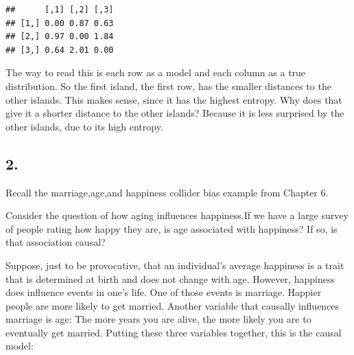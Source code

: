 \documentclass[
]{article}
\newenvironment{Shaded}{\begin{snugshade}}{\end{snugshade}}
\newcommand{\CommentTok}[1]{\textcolor[rgb]{0.56,0.35,0.01}{\textit{#1}}}
\newcommand{\ControlFlowTok}[1]{\textcolor[rgb]{0.13,0.29,0.53}{\textbf{#1}}}
\newcommand{\DataTypeTok}[1]{\textcolor[rgb]{0.13,0.29,0.53}{#1}}
\newcommand{\DecValTok}[1]{\textcolor[rgb]{0.00,0.00,0.81}{#1}}
\newcommand{\KeywordTok}[1]{\textcolor[rgb]{0.13,0.29,0.53}{\textbf{#1}}}
\newcommand{\NormalTok}[1]{#1}
\newcommand{\OperatorTok}[1]{\textcolor[rgb]{0.81,0.36,0.00}{\textbf{#1}}}
\newcommand{\OtherTok}[1]{\textcolor[rgb]{0.56,0.35,0.01}{#1}}
\newcommand{\StringTok}[1]{\textcolor[rgb]{0.31,0.60,0.02}{#1}}
\begin{document}
\begin{Shaded}
\end{Shaded}

\begin{verbatim}
##      [,1] [,2] [,3]
## [1,] 0.00 0.87 0.63
## [2,] 0.97 0.00 1.84
## [3,] 0.64 2.01 0.00
\end{verbatim}

The way to read this is each row as a model and each column as a true
distribution. So the first island, the first row, has the smaller
distances to the other islands. This makes sense, since it has the
highest entropy. Why does that give it a shorter distance to the other
islands? Because it is less surprised by the other islands, due to its
high entropy.

\hypertarget{section-1}{%
\subsection{2.}\label{section-1}}

Recall the marriage,age,and happiness collider bias example from Chapter
6.

Consider the question of how aging influences happiness.If we have a
large survey of people rating how happy they are, is age associated with
happiness? If so, is that association causal?

Suppose, just to be provocative, that an individual's average happiness
is a trait that is determined at birth and does not change with age.
However, happiness does influence events in one's life. One of those
events is marriage. Happier people are more likely to get married.
Another variable that causally influences marriage is age: The more
years you are alive, the more likely you are to eventually get married.
Putting these three variables together, this is the causal model:
\end{document}
